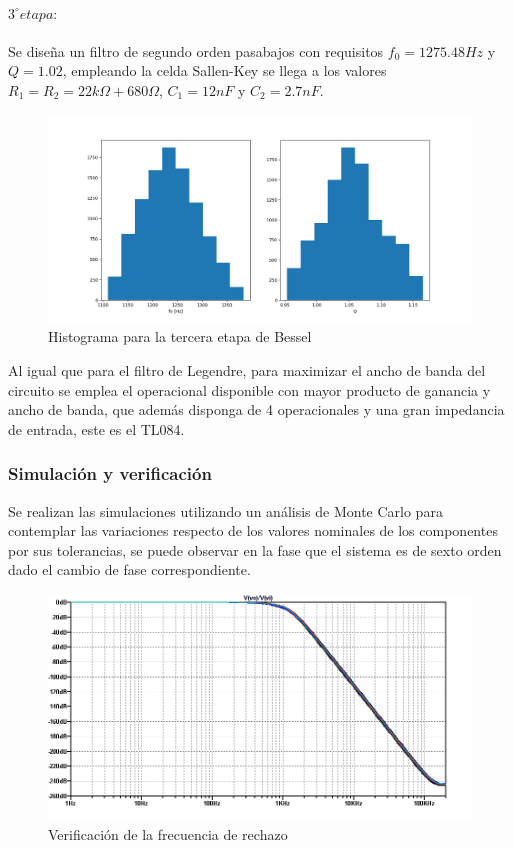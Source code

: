 \paragraph{$3^{\circ} etapa:$} Se dise\~na un filtro de segundo orden pasabajos con requisitos $f_0 = 1275.48Hz$ y $Q = 1.02$, empleando la celda Sallen-Key se llega a los valores $R_1 = R_2 = 22k \Omega + 680\Omega$, $C_1 = 12nF$ y $C_2 = 2.7nF$.

\begin{figure}[H]
    \centering
    \includegraphics[scale=0.4]{../EJ1/Recursos/bessel_histogram_three.png}
    \caption{Histograma para la tercera etapa de Bessel}
    \label{fig:bessel_histogram_three}
\end{figure}

Al igual que para el filtro de Legendre, para maximizar el ancho de banda del circuito se emplea el operacional disponible con mayor producto de ganancia y ancho de banda, que adem\'as disponga de 4 operacionales y una gran impedancia de entrada, este es el TL084.

\subsubsection{Simulaci\'on y verificaci\'on}
Se realizan las simulaciones utilizando un an\'alisis de Monte Carlo para contemplar las variaciones respecto de los valores nominales de los componentes por sus tolerancias,
se puede observar en la fase que el sistema es de sexto orden dado el cambio de fase correspondiente.

\begin{figure}[H]
    \centering
    \includegraphics[scale=0.6]{../EJ1/Recursos/bessel_verificacion_magnitud.png}
    \caption{Verificaci\'on de la frecuencia de rechazo}
\end{figure}

